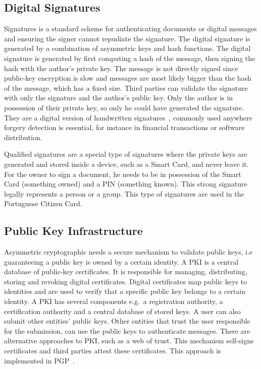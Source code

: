 \subsection{Digital Signatures}\label{chap:background:crypto:signatures}

Signatures is a standard scheme for authenticating documents or digital messages and ensuring the signer cannot repudiate the signature. The digital signature is generated by a combination of asymmetric keys and hash functions.
The digital signature is generated by first computing a hash of the message, then signing the hash with the author's private key. The message is not directly signed since public-key encryption is slow and messages are most likely bigger than the hash of the message, which has a fixed size. Third parties can validate the signature with only the signature and the author's public key. Only the author is in possession of their private key, so only he could have generated the signature.
They are a digital version of handwritten signatures~\cite{digitalsignatures}, commonly used anywhere forgery detection is essential, for instance in financial transactions or software distribution.

Qualified signatures are a special type of signatures where the private keys are generated and stored inside a device, such as a Smart Card, and never leave it. For the owner to sign a document, he needs to be in possession of the Smart Card (something owned) and a \ac{PIN} (something known). This strong signature legally represents a person or a group. This type of signatures are used in the Portuguese Citizen Card.

\subsection{Public Key Infrastructure}\label{chap:background:PKI}

Asymmetric cryptographic needs a secure mechanism to validate public keys, i.e guaranteeing a public key is owned by a certain identity.
A \ac{PKI} is a central database of public-key certificates. It is responsible for managing, distributing, storing and revoking digital certificates. Digital certificates map public keys to identities and are used to verify that a specific public key belongs to a certain identity.
A \ac{PKI} has several components e.g.\ a registration authority, a certification authority and a central database of stored keys.
A user can also submit other entities' public keys. Other entities that trust the user responsible for the submission, can use the public keys to authenticate messages.
There are alternative approaches to \ac{PKI}, such as a web of trust. This mechanism self-signs certificates and third parties attest these certificates. This approach is implemented in \ac{PGP}~\cite{modelingPKI}.

